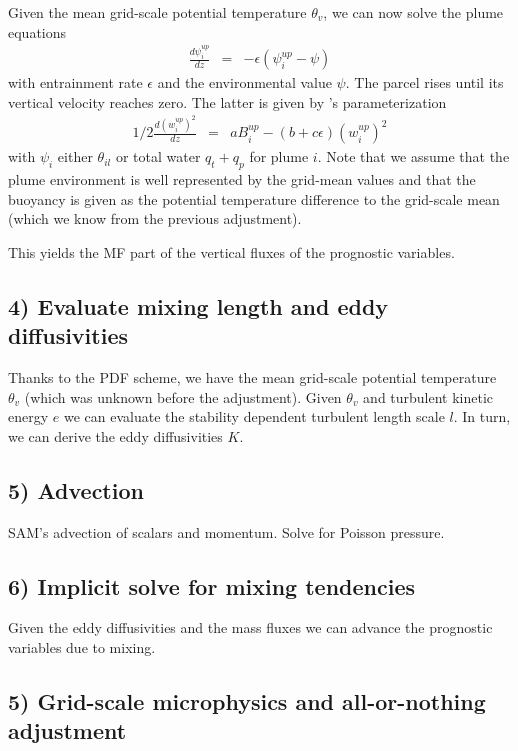 \documentclass[dvipdfmx,a4paper,10pt]{article}
\begin{document}
Given the mean grid-scale potential temperature $\theta_v$, we can now solve the plume equations
\begin{eqnarray}\label{eqn:conserved}
 \frac{d\psi_i^{up} }{d z } &=& - \epsilon(\psi_i^{up} - \psi)
\end{eqnarray}
with entrainment rate $\epsilon$ and the environmental value $\psi$. The parcel rises until its vertical velocity reaches zero. The latter is given by \cite{simpson69a}'s parameterization
\begin{eqnarray}\label{eqn:w}
 1/2\frac{d (w_i^{up})^2 }{d z } &=& aB^{up}_i- (b+c\epsilon)(w_i^{up})^2
\end{eqnarray}
with $\psi_i$ either $\theta_{il}$ or total water $q_t+q_p$ for plume $i$. Note that we assume that the plume environment is well represented by the grid-mean values and that the buoyancy is given as the potential temperature difference to the grid-scale mean (which we know from the previous adjustment).

This yields the MF part of the vertical fluxes of the prognostic variables.

\subsection{4) Evaluate mixing length and eddy diffusivities  }

Thanks to the PDF scheme, we have the mean grid-scale potential temperature $\theta_v$ (which was unknown before the adjustment). Given $\theta_v$ and turbulent kinetic energy $e$ we can evaluate the stability dependent turbulent length scale $l$. In turn, we can derive the eddy diffusivities $K$.


\subsection{5) Advection}

SAM's advection of scalars and momentum. Solve for Poisson pressure.

\subsection{6) Implicit solve for mixing tendencies}

Given the eddy diffusivities and the mass fluxes we can advance the prognostic variables due to mixing.

\subsection{5) Grid-scale microphysics and all-or-nothing adjustment}
\end{document}

